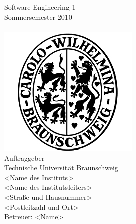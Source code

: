 
\thispagestyle{plain}      %

\begin{titlepage}

\begin{center}

{}\\[5ex]

{}\\[5ex]

Software Engineering 1 \\
Sommersemester 2010\\[6ex]

{}\\[5ex]

\includegraphics[scale=0.8]{bilder/carolo.jpg}\\[5ex]

Auftraggeber\\
Technische Universität Braunschweig\\
<Name des Instituts>\\
<Name des Institutsleiters>\\
<Straße und Hausnummer>\\
<Postleitzahl und Ort>\\[2ex]
Betreuer: <Name>\\[5ex]


\end{center}
\end{titlepage}
